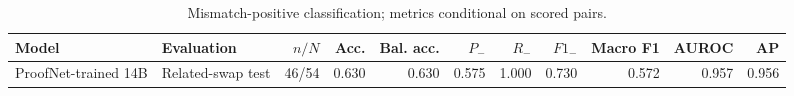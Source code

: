 \begin{table}[htbp]
\centering
\caption{Mismatch-positive classification; metrics conditional on scored pairs.}
\label{tab:informalization-proofnet-metrics}
\small
\begin{adjustbox}{max width=\textwidth}
\begin{tabular}{llrrrrrrrrr}
\toprule
Model & Evaluation & $n/N$ & Acc. & Bal. acc. & $P_-$ & $R_-$ & $F1_-$ & Macro F1 & AUROC & AP \\
\midrule
ProofNet-trained 14B & Related-swap test & 46/54 & 0.630 & 0.630 & 0.575 & 1.000 & 0.730 & 0.572 & 0.957 & 0.956 \\
\bottomrule
\end{tabular}
\end{adjustbox}
\end{table}
